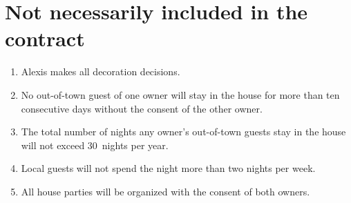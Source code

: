 \documentclass[12pt]{article}
\begin{document}
\section{Not necessarily included in the contract}
\begin{enumerate}

\item Alexis makes all decoration decisions.

\item No out-of-town guest of one owner will stay in the house for 
more than ten consecutive days without the consent of the 
other owner.

\item The total number of nights any owner's out-of-town guests stay 
in the house will not exceed 30~nights per year.

\item Local guests will not spend the night more than two nights per 
week.

\item All house parties will be organized with the consent of both 
owners.

\end{enumerate}
\end{document}
